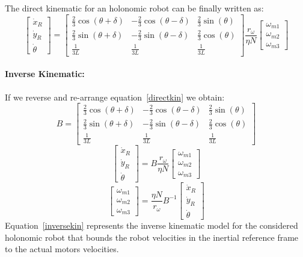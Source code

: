 The direct kinematic for an holonomic robot can be finally written as:
\begin{equation}
\begin{bmatrix}
\dot{x}_R\\
\dot{y}_R\\
\dot{\theta}
\end{bmatrix} =
\begin{bmatrix}
\frac{2}{3}\cos(\theta+\delta) & -\frac{2}{3}\cos(\theta-\delta) & \frac{2}{3}\sin(\theta)\\
\frac{2}{3}\sin(\theta+\delta) & -\frac{2}{3}\sin(\theta-\delta) & \frac{2}{3}\cos(\theta)\\
\frac{1}{3L} & \frac{1}{3L} & \frac{1}{3L}
\end{bmatrix}
\frac{r_\omega}{\eta N}
\begin{bmatrix}
\omega_{m1}\\
\omega_{m2}\\
\omega_{m3}
\end{bmatrix}
\label{directkin}
\end{equation}
\paragraph{Inverse Kinematic:} If we reverse and re-arrange equation~\ref{directkin} we obtain:
\begin{equation}
B = \begin{bmatrix}
\frac{2}{3}\cos(\theta+\delta) & -\frac{2}{3}\cos(\theta-\delta) & \frac{2}{3}\sin(\theta)\\
\frac{2}{3}\sin(\theta+\delta) & -\frac{2}{3}\sin(\theta-\delta) & \frac{2}{3}\cos(\theta)\\
\frac{1}{3L} & \frac{1}{3L} & \frac{1}{3L}
\end{bmatrix}
\end{equation}
\begin{equation}
\begin{bmatrix}
\dot{x}_R\\
\dot{y}_R\\
\dot{\theta}
\end{bmatrix} =
B
\frac{r_\omega}{\eta N}
\begin{bmatrix}
\omega_{m1}\\
\omega_{m2}\\
\omega_{m3}
\end{bmatrix}
\end{equation}
\begin{equation}
\begin{bmatrix}
\omega_{m1}\\
\omega_{m2}\\
\omega_{m3}
\end{bmatrix}=
\frac{\eta N}{r_\omega}B^{-1}
\begin{bmatrix}
\dot{x}_R\\
\dot{y}_R\\
\dot{\theta}
\end{bmatrix}
\label{inversekin}
\end{equation}
Equation~\ref{inversekin} represents the inverse kinematic model for the considered holonomic robot that bounds the robot velocities in the inertial reference frame to the actual motors velocities.

